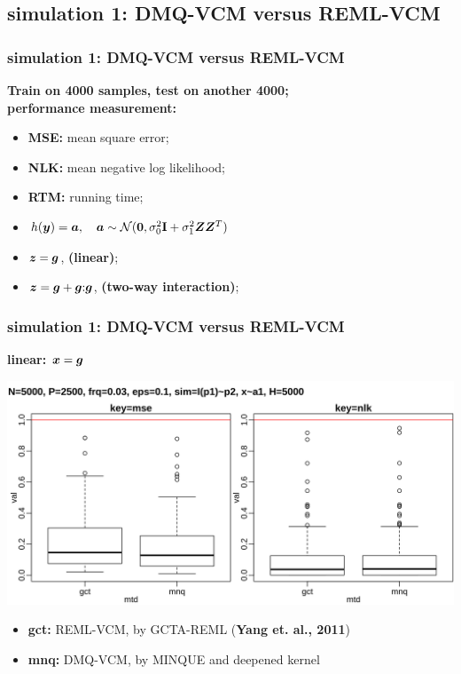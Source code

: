 \documentclass{beamer}
\begin{document}
\subsection{simulation 1: DMQ-VCM versus REML-VCM}
\begin{frame}\frametitle{simulation 1: DMQ-VCM versus REML-VCM}
  \textbf{Train on 4000 samples, test on another 4000;} \\
  {\color{blue}\textbf{performance measurement:}}
  \begin{itemize}
  \item \textbf{MSE:} mean square error;
  \item \textbf{NLK:} mean negative log likelihood;
  \item \textbf{RTM:} running time;
  \end{itemize}
  \begin{itemize}
  \item $h({\bm{y}})={\bm{a}}, \quad {\bm{a}} \sim \mathcal{N}(\bm{0}, \sigma_0^2\textbf{I} + \sigma_1^2{\bm{Z}}{\bm{Z}}^T)$
  \item ${\bm{z}} = {\bm{g}}$, \textbf{(linear)};
  \item ${\bm{z}} = {\bm{g}} + {\bm{g}}\mathbf{:}{\bm{g}}$, \textbf{(two-way interaction)};
  \end{itemize}
\end{frame}
\begin{frame}\frametitle{simulation 1: DMQ-VCM versus REML-VCM}
  \textbf{linear: ${\bm{x}} = {\bm{g}}$} \\
  \centerline{\includegraphics[width=.9\linewidth]{img/ukb_whl_p01}}
  \textbf{\color{blue}{inner plot: strategies, from left to right:}}
  \begin{itemize}
  \item \textbf{gct:} REML-VCM, by GCTA-REML (\textbf{Yang et. al., 2011})
  \item \textbf{mnq:} DMQ-VCM, by MINQUE and deepened kernel
  \end{itemize}
\end{frame}
\end{document}
